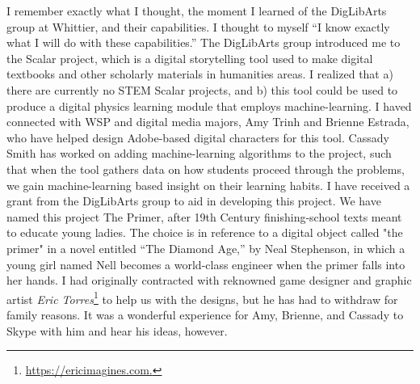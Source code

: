 \documentclass[../main.tex]{subfiles}
\begin{document}
I remember exactly what I thought, the moment I learned of the DigLibArts group at Whittier, and their capabilities.  I thought to myself ``I know exactly what I will do with these capabilities.''  The DigLibArts group introduced me to the Scalar project, which is a digital storytelling tool used to make digital textbooks and other scholarly materials in humanities areas.  I realized that a) there are currently no STEM Scalar projects, and b) this tool could be used to produce a digital physics learning module that employs machine-learning.  I haved connected with WSP and digital media majors, Amy Trinh and Brienne Estrada, who have helped design Adobe-based digital characters for this tool.  Cassady Smith has worked on adding machine-learning algorithms to the project, such that when the tool gathers data on how students proceed through the problems, we gain machine-learning based insight on their learning habits.  I have received a grant from the DigLibArts group to aid in developing this project.  We have named this project The Primer, after 19th Century finishing-school texts meant to educate young ladies.  The choice is in reference to a digital object called "the primer" in a novel entitled ``The Diamond Age,'' by Neal Stephenson, in which a young girl named Nell becomes a world-class engineer when the primer falls into her hands.  I had originally contracted with reknowned game designer and graphic artist \textit{Eric Torres}\footnote{\url{https://ericimagines.com.}} to help us with the designs, but he has had to withdraw for family reasons.  It was a wonderful experience for Amy, Brienne, and Cassady to Skype with him and hear his ideas, however.
\end{document}
